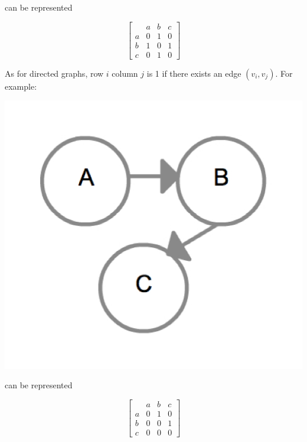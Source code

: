 can be represented

\[
\left[
\begin{array}{cccc}
  & a & b & c \\
a & 0 & 1 & 0 \\
b & 1 & 0 & 1 \\
c & 0 & 1 & 0
\end{array}
\right]
\]

As for directed graphs, row $i$ column $j$ is 1 if there exists an
edge $(v_i,v_j)$.  For example:

{
  \includegraphics[scale=0.2]{DiGraph}
  \label{fig:DiGraph}
}

can be represented

\[
\left[
\begin{array}{cccc}
  & a & b & c \\
a & 0 & 1 & 0 \\
b & 0 & 0 & 1 \\
c & 0 & 0 & 0
\end{array}
\right]
\]
